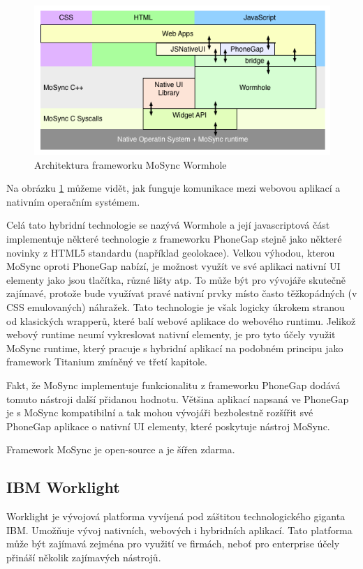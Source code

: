 \begin{figure}\centering
\includegraphics[width=1.0\textwidth]{MoSyncUI_Layers.png}
\caption{Architektura frameworku MoSync Wormhole \cite{javascript_for_native_widgets}}
\label{fig:MoSyncWormholeArchitecture}
\end{figure} 

Na obrázku \ref{fig:MoSyncWormholeArchitecture} můžeme vidět, jak funguje komunikace mezi webovou aplikací a nativním operačním systémem.

Celá tato hybridní technologie se nazývá Wormhole a její javascriptová část implementuje některé technologie z frameworku PhoneGap stejně jako některé novinky z HTML5 standardu (například geolokace). Velkou výhodou, kterou MoSync oproti PhoneGap nabízí, je možnost využít ve své aplikaci nativní UI elementy jako jsou tlačítka, různé lišty atp. To může být pro vývojáře skutečně zajímavé, protože bude využívat pravé nativní prvky místo často těžkopádných (v CSS emulovaných) náhražek. Tato technologie je však logicky úkrokem stranou od klasických wrapperů, které balí webové aplikace do webového runtimu. Jelikož webový runtime neumí vykreslovat nativní elementy, je pro tyto účely využit MoSync runtime, který pracuje s hybridní aplikací na podobném principu jako framework Titanium zmíněný ve třetí kapitole.

Fakt, že MoSync implementuje funkcionalitu z frameworku PhoneGap dodává tomuto nástroji další přidanou hodnotu. Většina aplikací napsaná ve PhoneGap je s MoSync kompatibilní a tak mohou vývojáři bezbolestně rozšířit své PhoneGap aplikace o nativní UI elementy, které poskytuje nástroj MoSync.

Framework MoSync je open-source a je šířen zdarma.

\subsection{IBM Worklight}
Worklight je vývojová platforma vyvíjená pod záštitou technologického giganta IBM. Umožňuje vývoj nativních, webových i hybridních aplikací. Tato platforma může být zajímavá zejména pro využití ve firmách, neboť pro enterprise účely přináší několik zajímavých nástrojů.


